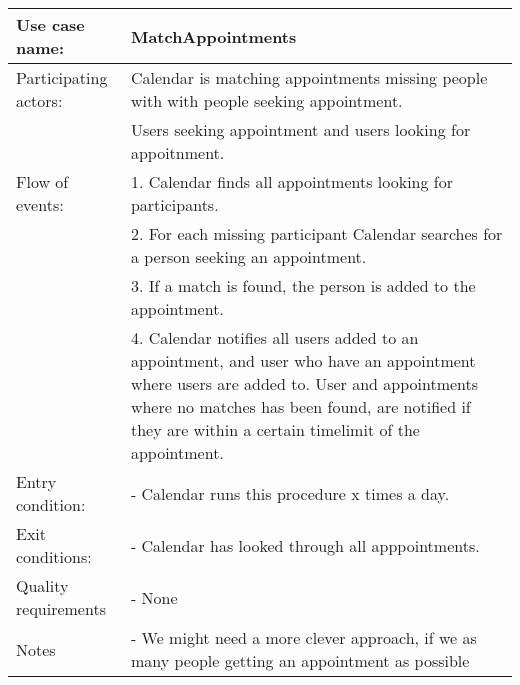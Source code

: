 {\tabulinesep=1.2mm
\begin{tabu}{ | p{3cm} | p{13cm} |}
    \hline
    Use case name: 			& 		MatchAppointments\\ \hline
    Participating actors:	& 		Calendar is matching appointments missing people with with people seeking appointment. \\
 							&		Users seeking appointment and users looking for appoitnment.\\ \hline
    Flow of events: 		& 		1. Calendar finds all appointments looking for participants. \\
							&		2. For each missing participant Calendar searches for a person seeking an appointment.\\
							&		3. If a match is found, the person is added to the appointment.\\
							&		4. Calendar notifies all users added to an appointment, and user who have an appointment where users are added to. User and appointments where no matches has been found, are notified if they are within a certain timelimit of the appointment.\\\hline
    Entry condition: 		& 		- Calendar runs this procedure x times a day. \\ \hline
	Exit conditions: 		&		- Calendar has looked through all apppointments.\\\hline
	Quality requirements	&	 	- None \\\hline
	Notes					&	 	- We might need a more clever approach, if we as many people getting an appointment as possible \\\hline
\end{tabu}
}